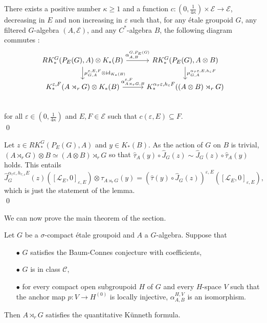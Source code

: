 \begin{lem}\label{KunnethLemma}
There exists a positive number $\kappa\geq 1$ and a function $c : (0,\frac{1}{4\kappa})\times\mathcal E\rightarrow \mathcal E$, decreasing in $E$ and non increasing in $\varepsilon$ such that, for any étale groupoid $G$, any filtered $G$-algebra $(A,\mathcal E)$, and any $C^*$-algebra $B$, the following diagram commutes :
\[\begin{tikzcd}
RK_*^G(P_E(G),A)\otimes K_*(B) \arrow{r}{\alpha^{G,P_E(G)}_{A,B}}\arrow{d}{\mu_{G,A}^{\varepsilon,E,F}\otimes \text{id}_{K_*(B)}} & 
RK_*^G(P_E(G),A\otimes B) \arrow{d}{\mu_{G,A}^{\alpha_ \tau\varepsilon,E,h_\varepsilon F}} \\
K_*^{\varepsilon,F}(A\rtimes_r G)\otimes K_*(B) \arrow{r}{\alpha_{A\rtimes_r G,B}^{\varepsilon,F}} & 
K_*^{\alpha_\tau\varepsilon,h_{\varepsilon}F}((A\otimes B)\rtimes_r G)\\
\end{tikzcd}\] 
for all $\varepsilon\in(0,\frac{1}{4\kappa})$ and $E,F\in\mathcal E$ such that $ c(\varepsilon,E)\subseteq F$. \\
\qed
\end{lem}

\begin{dem}
Let $z\in RK_*^G(P_E(G),A)$ and $y\in K_*(B)$. As the action of $G$ on $B$ is trivial, $(A\rtimes_r G)\otimes B\simeq (A\otimes B)\rtimes_r G$ so that $\hat\tau_A(y)\circ \hat J_{G}(z) \sim \hat J_{G}(z)\circ \hat\tau_A(y) $ holds. This entails
\[\hat J_G^{\alpha_\tau\varepsilon, h_{\tau,\varepsilon}E}(z)\left([\mathcal L_E,0]_{\varepsilon, E} \right)\otimes \tau_{A\rtimes_r G}(y) = 
\left( \hat\tau(y)\circ \hat J_G(z) \right)^{\varepsilon, E}\left([\mathcal L_E,0]_{\varepsilon, E}\right),\]
which is just the statement of the lemma.\\
\qed
\end{dem}


We can now prove the main theorem of the section.

\begin{thm}\label{Kunneth}
Let $G$ be a $\sigma$-compact étale groupoid and $A$ a $G$-algebra. Suppose that 
\begin{itemize}
\item[$\bullet$] $G$ satisfies the Baum-Connes conjecture with coefficients,
\item[$\bullet$] $G$ is in class $\mathcal C$,
\item[$\bullet$] for every compact open subgroupoid $H$ of $G$ and every $H$-space $V$ such that the anchor map $p : V \rightarrow H^{(0)}$ is locally injective, $\alpha_{A,B}^{H,V}$ is an isomorphism.
\end{itemize} 
Then $A\rtimes_r G$ satisfies the quantitative Künneth formula.
\end{thm}

